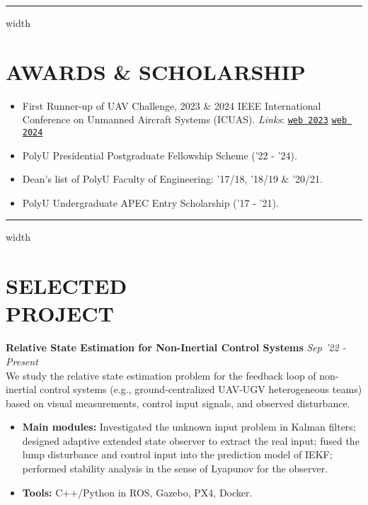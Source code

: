 \documentclass[overlapped]{res}
\newcommand{\pink}[1]{\textcolor{pink!40!red}{#1}} %
\begin{document}
\begin{resume}
\par\noindent\hrule width \linewidth %
\section{AWARDS \& SCHOLARSHIP}
\begin{itemize}
  \item First Runner-up of UAV Challenge, 2023 \& 2024 IEEE International Conference on Unmanned Aircraft Systems (ICUAS). \textit{Links}: \pink{
    \texttt{\href{https://www.polyu.edu.hk/publications/pulse-polyu/issue/202308/achievements/aae-team-wins-first-runner-up-prize-at-icuas-23-uav-competition}{web 2023}}
  } \pink{
    \texttt{\href{https://www.polyu.edu.hk/aae/news-and-events/news/2024/jun-20_icuas-2024-first-runner-up/}{web 2024}}
  } 
  \item PolyU Presidential Postgraduate Fellowship Scheme ('22 - '24).
  \item Dean’s list of PolyU Faculty of Engineering: '17/18, '18/19 \& '20/21.
  \item PolyU Undergraduate APEC Entry Scholarship ('17 - '21).
\end{itemize}
\par\noindent\hrule width \linewidth %

\section{SELECTED\\PROJECT}

\textbf{Relative State Estimation for Non-Inertial Control Systems}  
\hfill \textit{Sep '22 - Present} \\
We study the relative state estimation problem for the feedback loop of non-inertial control systems (e.g., ground-centralized UAV-UGV heterogeneous teams) based on visual measurements, control input signals, and observed disturbance. 

\begin{itemize}
  \item \textbf{Main modules:} Investigated the unknown input problem in Kalman filters; designed adaptive extended state observer to extract the real input; fused the lump disturbance and control input into the prediction model of IEKF; performed stability analysis in the sense of Lyapunov for the observer.
  \item \textbf{Tools:} C++/Python in ROS, Gazebo, PX4, Docker.
\end{itemize}


\end{resume}
\end{document}
